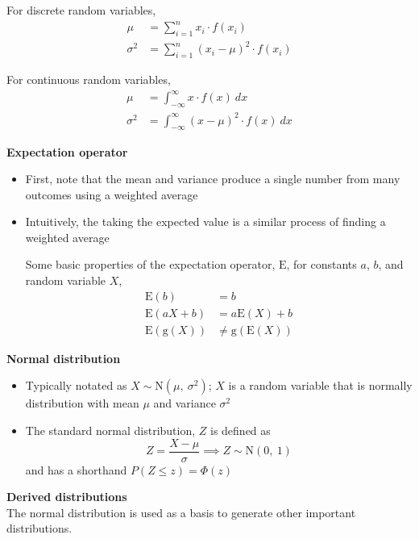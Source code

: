 \documentclass[a4paper]{article}
\newcommand{\heading}[1]{{\small\textbf{#1}}}
\begin{document}
\begin{multicols*}{4}
\begin{itemize}
        For discrete random variables,
        \begin{align*}
            \mu &= \sum_{i=1}^n x_i \cdot f(x_i) \\
            \sigma^2 &= \sum_{i=1}^n
                (x_i - \mu)^2 \cdot f(x_i)
        \end{align*}

        For continuous random variables,
        \begin{align*}
            \mu &= \int^\infty_{-\infty} x \cdot f(x)\ dx \\
            \sigma^2 &= \int^\infty_{-\infty} (x - \mu)^2 \cdot f(x)\ dx
        \end{align*}
\end{itemize}

\heading{Expectation operator}
\begin{itemize} \itemsep -0.5em
    \item First, note that the mean and variance produce a single number
        from many outcomes using a weighted average
    \item Intuitively, the taking the expected value is a similar
        process of finding a weighted average
    
        Some basic properties of the expectation operator, $\mathrm{E}$,
        for constants $a$, $b$, and random variable $X$,
        \begin{align*}
            \mathrm{E}(b) &= b\\
            \mathrm{E}(aX + b) &= a\mathrm{E}(X) + b\\
            \mathrm{E}(\mathrm{g}(X)) &\neq \mathrm{g}(\mathrm{E}(X))
        \end{align*}
\end{itemize}

\heading{Normal distribution}
\begin{itemize} \itemsep -0.5em
        \item Typically notated as $X\sim \mathrm{N}(\mu,\ \sigma^2)$;
        $X$ is a random variable that is normally distribution with 
        mean $\mu$ and variance $\sigma^2$
    \item The standard normal distribution, $Z$ is defined as
        $$Z = \frac{X - \mu}{\sigma} \implies Z\sim \mathrm{N}(0,\ 1)$$
        and has a shorthand $P(Z \leq z) = \Phi(z)$
\end{itemize}

\heading{Derived distributions}\\
The normal distribution is used as a basis to generate other important 
distributions.\\


\end{multicols*}
\end{document}
